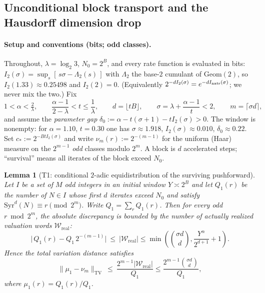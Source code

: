 \documentclass[12pt,a4paper]{article}
\newtheorem{lemma}[theorem]{Lemma}
\begin{document}
\subsection{Unconditional block transport and the Hausdorff dimension drop}
\label{subsec:transport_T1T3}

\paragraph{Setup and conventions (bits; odd classes).}
Throughout, $\lambda=\log_2 3$, $N_0=2^B$, and every rate function is evaluated
in bits: $I_2(\sigma)=\sup_{s}[\,s\sigma-\Lambda_2(s)\,]$ with $\Lambda_2$ the
base-$2$ cumulant of $\mathrm{Geom}(2)$, so $I_2(1.33)\approx0.25498$ and
$I_2(2)=0$. (Equivalently $2^{-dI_2(\sigma)}=e^{-dI_{\rm nats}(\sigma)}$; we never
mix the two.) Fix
\[
1<\alpha<\tfrac2\lambda,\qquad
\frac{\alpha-1}{2-\lambda}<t\le\frac1\lambda,\qquad
d=\lfloor tB\rfloor,\qquad
\sigma=\lambda+\frac{\alpha-1}{t}<2,\qquad m=\lceil\sigma d\rceil,
\]
and assume the \emph{parameter gap}
$\delta_0:=\alpha-t(\sigma+1)-tI_2(\sigma)>0$.
The window is nonempty: for $\alpha=1.10$, $t=0.30$ one has
$\sigma\approx1.918$, $I_2(\sigma)\approx0.010$, $\delta_0\approx0.22$.
Set $c_*:=2^{-BtI_2(\sigma)}$ and write $\nu_m(r):=2^{-(m-1)}$ for the uniform
(Haar) measure on the $2^{m-1}$ \emph{odd} classes modulo $2^m$.
A block is $d$ accelerated steps; ``survival'' means all iterates of the block
exceed $N_0$.

\begin{lemma}[T1: conditional $2$-adic equidistribution of the surviving pushforward]
\label{lem:T1}
Let $I$ be a set of $M$ odd integers in an initial window $Y \asymp 2^B$ and let $Q_1(r)$ be the number of
$N\in I$ whose first $d$ iterates exceed $N_0$ and satisfy
$\mathrm{Syr}^d(N)\equiv r\pmod{2^m}$. Write $Q_1=\sum_r Q_1(r)$. Then for
every odd $r\bmod 2^m$, the absolute discrepancy is bounded by the number of actually realized valuation words $\mathcal{W}_{\text{real}}$:
\[
\big|\,Q_1(r)-Q_1\,2^{-(m-1)}\big|\ \le\ |\mathcal{W}_{\text{real}}| \le \min\left(\binom{\sigma d}{d}, \frac{Y^\alpha}{2^{d+1}}+1\right).
\]
Hence the total variation distance satisfies
\[
\|\mu_1-\nu_m\|_{\mathrm{TV}}\ \le\ \frac{2^{m-1} |\mathcal{W}_{\text{real}}|}{Q_1} \le \frac{2^{m-1} \binom{\sigma d}{d}}{Q_1},
\]
where $\mu_1(r)=Q_1(r)/Q_1$. 
\end{lemma}
\end{document}

